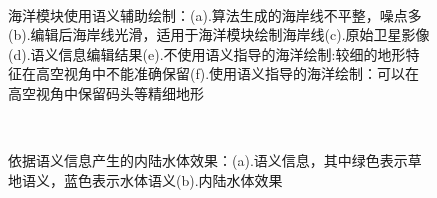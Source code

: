 \begin{figure}[H]
     \\
    \caption{海洋模块使用语义辅助绘制：(a).算法生成的海岸线不平整，噪点多(b).编辑后海岸线光滑，适用于海洋模块绘制海岸线(c).原始卫星影像(d).语义信息编辑结果(e).不使用语义指导的海洋绘制:较细的地形特征在高空视角中不能准确保留(f).使用语义指导的海洋绘制：可以在高空视角中保留码头等精细地形}
\end{figure}

\begin{figure}[H]
    \centering
    \\
    \caption{依据语义信息产生的内陆水体效果：(a).语义信息，其中绿色表示草地语义，蓝色表示水体语义(b).内陆水体效果}
\end{figure}

